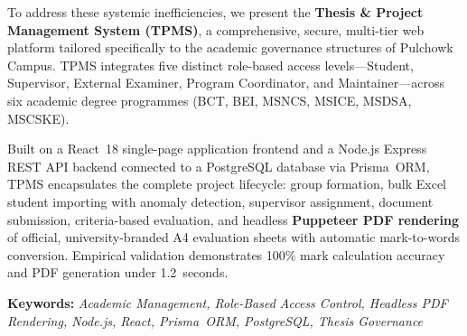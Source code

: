 \documentclass[12pt]{report}
\begin{document}
To address these systemic inefficiencies, we present the \textbf{Thesis \& Project
Management System (TPMS)}, a comprehensive, secure, multi-tier web platform tailored
specifically to the academic governance structures of Pulchowk Campus. TPMS integrates
five distinct role-based access levels---Student, Supervisor, External Examiner,
Program Coordinator, and Maintainer---across six academic degree programmes (BCT, BEI,
MSNCS, MSICE, MSDSA, MSCSKE).

Built on a React~18 single-page application frontend and a Node.js Express REST API
backend connected to a PostgreSQL database via Prisma~ORM, TPMS encapsulates the
complete project lifecycle: group formation, bulk Excel student importing with anomaly
detection, supervisor assignment, document submission, criteria-based evaluation, and
headless \textbf{Puppeteer PDF rendering} of official, university-branded A4 evaluation
sheets with automatic mark-to-words conversion. Empirical validation demonstrates
100\% mark calculation accuracy and PDF generation under 1.2~seconds.

\vspace{0.5cm}
\noindent\textbf{Keywords:} \textit{Academic Management, Role-Based Access Control,
Headless PDF Rendering, Node.js, React, Prisma~ORM, PostgreSQL, Thesis Governance}

\tableofcontents
{}
\listoffigures
{}
\listoftables
{}

\end{document}
